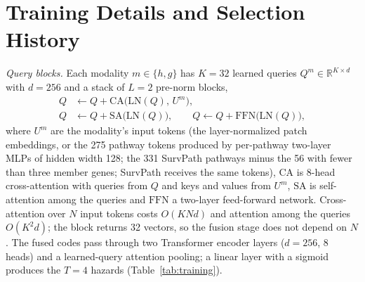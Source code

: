 \documentclass[9pt,journal]{IEEEtran}
\begin{document}
\section{Training Details and Selection History}
\label{sec:training}
\textit{Query blocks.} Each modality $m \in \{h, g\}$ has $K = 32$ learned queries $Q^m \in \mathbb{R}^{K \times d}$ with $d = 256$ and a stack of $L = 2$ pre-norm blocks,
\begin{align}
Q &\leftarrow Q + \mathrm{CA}\big(\mathrm{LN}(Q),\, U^m\big), \\
Q &\leftarrow Q + \mathrm{SA}\big(\mathrm{LN}(Q)\big),\qquad Q \leftarrow Q + \mathrm{FFN}\big(\mathrm{LN}(Q)\big),
\end{align}
where $U^m$ are the modality's input tokens (the layer-normalized patch embeddings, or the 275 pathway tokens produced by per-pathway two-layer MLPs of hidden width 128; the 331 SurvPath pathways minus the 56 with fewer than three member genes; SurvPath receives the same tokens), $\mathrm{CA}$ is 8-head cross-attention with queries from $Q$ and keys and values from $U^m$, $\mathrm{SA}$ is self-attention among the queries and $\mathrm{FFN}$ a two-layer feed-forward network. Cross-attention over $N$ input tokens costs $O(KNd)$ and attention among the queries $O(K^2 d)$; the block returns 32 vectors, so the fusion stage does not depend on $N$. The fused codes pass through two Transformer encoder layers ($d = 256$, 8 heads) and a learned-query attention pooling; a linear layer with a sigmoid produces the $T = 4$ hazards (Table~\ref{tab:training}).
\end{document}
